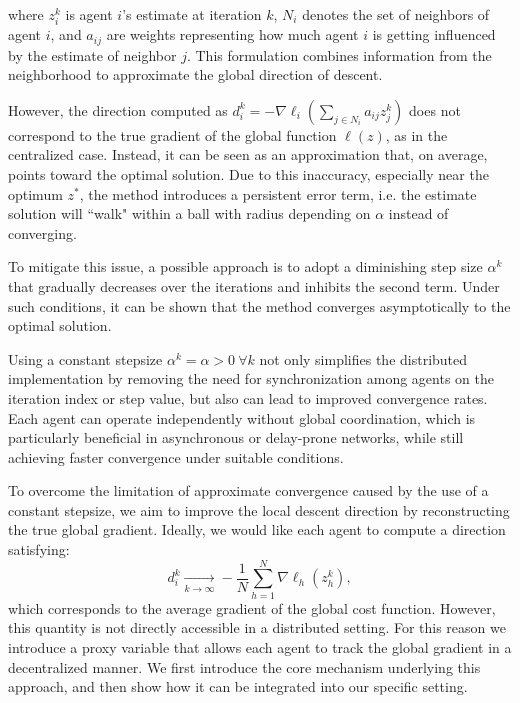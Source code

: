 where $z_i^k$ is agent $i$'s estimate at iteration $k$, $N_i$ denotes the set of neighbors of agent $i$, and $a_{ij}$ are weights representing how much agent $i$ is getting influenced by the estimate of neighbor $j$. This formulation combines information from the neighborhood to approximate the global direction of descent.

However, the direction computed as $d_i^k = -\nabla \ell_i\left( \sum_{j \in N_i} a_{ij} z_j^k \right)$ does not correspond to the true gradient of the global function $\ell(z)$, as in the centralized case. Instead, it can be seen as an approximation that, on average, points toward the optimal solution. Due to this inaccuracy, especially near the optimum $z^*$, the method introduces a persistent error term, i.e. the estimate solution will ``walk" within a ball with radius depending on $\alpha$ instead of converging.

To mitigate this issue, a possible approach is to adopt a diminishing step size $\alpha^k$ that gradually decreases over the iterations and inhibits the second term. Under such conditions, it can be shown that the method converges asymptotically to the optimal solution.

Using a constant stepsize $\alpha^k = \alpha > 0 \ \forall k$ not only simplifies the distributed implementation by removing the need for synchronization among agents on the iteration index or step value, but also can lead to improved convergence rates. Each agent can operate independently without global coordination, which is particularly beneficial in asynchronous or delay-prone networks, while still achieving faster convergence under suitable conditions.

To overcome the limitation of approximate convergence caused by the use of a constant stepsize, we aim to improve the local descent direction by reconstructing the true global gradient. Ideally, we would like each agent to compute a direction satisfying:
\[
d_i^k \xrightarrow[k \to \infty]{} -\frac{1}{N} \sum_{h=1}^{N} \nabla \ell_h(z_h^k),
\]
which corresponds to the average gradient of the global cost function. However, this quantity is not directly accessible in a distributed setting. For this reason we introduce a proxy variable that allows each agent to track the global gradient in a decentralized manner. We first introduce the core mechanism underlying this approach, and then show how it can be integrated into our specific setting.

